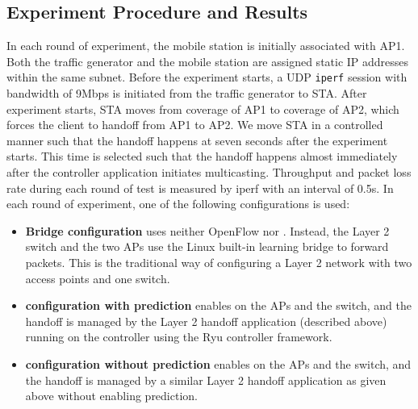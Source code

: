 \subsection{Experiment Procedure and Results}
In each round of experiment, the mobile station is initially associated with AP1. Both the traffic generator
and the mobile station are assigned static IP addresses within the same subnet. Before the experiment
starts, a UDP \texttt{iperf} session with bandwidth of 9Mbps is initiated from
the traffic generator to STA.  After experiment starts, STA moves from coverage
of AP1 to coverage of AP2, which forces the client to handoff from AP1 to AP2.
We move STA in a controlled manner such that the handoff happens at seven seconds
after the experiment starts. This time is selected such that the handoff happens
almost immediately after the controller application initiates multicasting.  Throughput
and packet loss rate during each round of test is measured by iperf with an
interval of 0.5s. In each round of experiment, one of the following
configurations is used:
\begin{itemize}
\item {\bf Bridge configuration} uses neither OpenFlow nor \aetherflow. Instead,
the Layer 2 switch and the two APs use the Linux built-in learning bridge to
forward packets. This is the traditional way of configuring a Layer 2 network
with two access points and one switch. 
\item {\bf \aetherflow configuration with prediction} enables \aetherflow on the APs and the
switch, and the handoff is managed by the Layer 2 handoff application (described
above) running on the \aetherflow controller using the Ryu controller framework.  
\item {\bf \aetherflow configuration without prediction} enables \aetherflow on the APs and the
switch, and the handoff is managed by a similar Layer 2 handoff application as given above without enabling prediction.  
\end{itemize}



